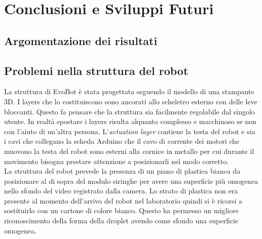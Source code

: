\chapter{Conclusioni e Sviluppi Futuri}
\vspace{0.5cm}
\label{cha:789}

\section{Argomentazione dei risultati}

\section{Problemi nella struttura del robot}
\label{sec:456}
La struttura di EvoBot è stata progettata seguendo il modello di una stampante 3D. I layers che lo costituiscono sono ancorati allo scheletro esterno con delle leve bloccanti. Questo fa pensare che la struttura sia facilmente regolabile dal singolo utente. In realtà spostare i layers risulta alquanto complesso e macchinoso se non con l'aiuto di un'altra persona. L'\emph{actuation layer} contiene la testa del robot e sia i cavi che collegano la scheda Arduino che il cavo di corrente dei motori che muovono la testa del robot sono esterni alla cornice in metallo per cui durante il movimento bisogna prestare attenzione a posizionarli nel modo corretto.
\\La struttura del robot prevede la presenza di un piano di plastica bianca da posizionare al di sopra del modulo siringhe per avere una superficie più omogenea nello sfondo del video registrato dalla camera. Lo strato di plastica non era presente al momento dell'arrivo del robot nel laboratorio quindi si è ricorsi a sostituirlo con un cartone di colore bianco. Questo ha permesso un migliore riconoscimento della forma della droplet avendo come sfondo una superficie omogenea. 

